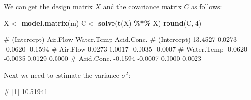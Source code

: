 \documentclass[
  a4paper,
]{article}
\newenvironment{Shaded}{\begin{snugshade}}{\end{snugshade}}
\newcommand{\DecValTok}[1]{\textcolor[rgb]{0.00,0.00,0.81}{#1}}
\newcommand{\FunctionTok}[1]{\textcolor[rgb]{0.13,0.29,0.53}{\textbf{#1}}}
\newcommand{\NormalTok}[1]{#1}
\newcommand{\OtherTok}[1]{\textcolor[rgb]{0.56,0.35,0.01}{#1}}
\newcommand{\SpecialCharTok}[1]{\textcolor[rgb]{0.81,0.36,0.00}{\textbf{#1}}}
\theoremstyle{definition}
\theoremstyle{definition}
\theoremstyle{definition}
\theoremstyle{definition}
\theoremstyle{remark}
\begin{document}
We can get the design matrix \(X\) and the covariance matrix \(C\) as follows:

\begin{Shaded}
\begin{Highlighting}[]
\NormalTok{X }\OtherTok{\textless{}{-}} \FunctionTok{model.matrix}\NormalTok{(m)}
\NormalTok{C }\OtherTok{\textless{}{-}} \FunctionTok{solve}\NormalTok{(}\FunctionTok{t}\NormalTok{(X) }\SpecialCharTok{\%*\%}\NormalTok{ X)}
\FunctionTok{round}\NormalTok{(C, }\DecValTok{4}\NormalTok{)}
\end{Highlighting}
\end{Shaded}

\begin{Shaded}
\begin{Highlighting}[]
\NormalTok{\#             (Intercept) Air.Flow Water.Temp Acid.Conc.}
\NormalTok{\# (Intercept)     13.4527   0.0273    {-}0.0620    {-}0.1594}
\NormalTok{\# Air.Flow         0.0273   0.0017    {-}0.0035    {-}0.0007}
\NormalTok{\# Water.Temp      {-}0.0620  {-}0.0035     0.0129     0.0000}
\NormalTok{\# Acid.Conc.      {-}0.1594  {-}0.0007     0.0000     0.0023}
\end{Highlighting}
\end{Shaded}

Next we need to estimate the variance \(\sigma^2\):

\begin{Shaded}
\end{Shaded}

\begin{Shaded}
\begin{Highlighting}[]
\NormalTok{\# [1] 10.51941}
\end{Highlighting}
\end{Shaded}
\end{document}
